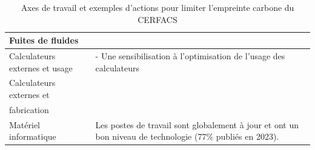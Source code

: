 \begin{table}[ht]
\begin{tabular}{|p{}|p{}|}
    \hline
    Fuites de fluides &  \\
    \hline
    Calculateurs externes et usage & 
    - Une sensibilisation à l’optimisation de l’usage des calculateurs \\
    \hline
    Calculateurs externes et \\fabrication &
    \phantom{-}
    \phantom{-}\\
    \hline
    Matériel informatique & 
    Les postes de travail sont globalement à jour et ont un bon niveau de technologie (77\% publiés en 2023). \\
    \hline
    \end{tabular}
    \caption{Axes de travail et exemples d'actions pour limiter l'empreinte carbone du \\ CERFACS}
    \label{tab:Eco_actions}
\end{table}



